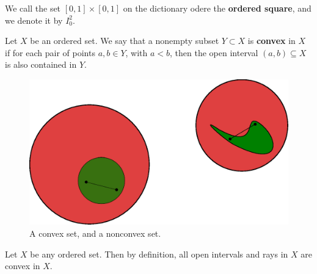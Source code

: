 \begin{definition}
    We call the set $[0,1] \times [0,1]$ on the dictionary odere the \textbf{ordered square}, and we
    denote it by $I_0^2$.
\end{definition}

\begin{definition}
    Let $X$ be an ordered set. We say that a nonempty subset $Y \subset X$ is \textbf{convex}
    in $X$ if for each pair of points  $a,b \in Y$, with  $a<b$, then the open interval  $(a,b) \subseteq X$ is
    also contained in  $Y$.
\end{definition}

\begin{figure}[h]
    \centering
    \includegraphics[scale = 0.5]{Figures/Chapter1/convex_nonconvex.eps}
    \caption{A convex set, and a nonconvex set.}
    \label{fig1.6}
\end{figure}

\begin{example}
    Let $X$ be any ordered set. Then by definition, all open intervals and rays in
    $X$ are convex in  $X$.
\end{example}

